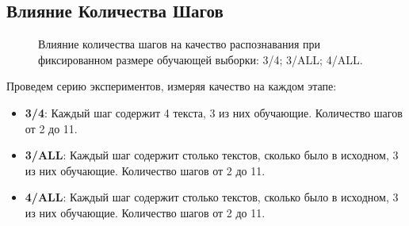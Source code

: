 \documentclass[12pt]{article}
\begin{document}
\subsection{Влияние Количества Шагов}

\begin{figure}[h!]  
\vspace{-2ex} \centering {}  
\hspace{2ex}
\hspace{2ex}
\caption{Влияние количества шагов на качество распознавания при фиксированном размере обучающей выборки:  3/4;  3/ALL;  4/ALL.} \label{fig:steps}
\end{figure}

Проведем серию экспериментов, измеряя качество на каждом этапе:

\begin{itemize}
	\item \textbf{3/4}: Каждый шаг содержит 4 текста, 3 из них обучающие. Количество шагов от 2 до 11. 
	\item \textbf{3/ALL}: Каждый шаг содержит столько текстов, сколько было в исходном, 3 из них обучающие. Количество шагов от 2 до 11. 
	\item \textbf{4/ALL}: Каждый шаг содержит столько текстов, сколько было в исходном, 3 из них обучающие. Количество шагов от 2 до 11. 
\end{itemize}
\end{document}
